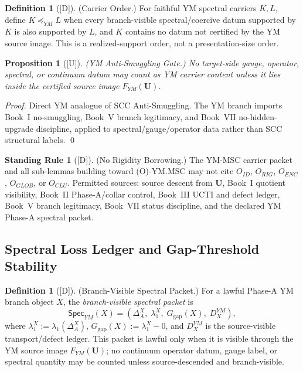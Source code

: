 \documentclass[12pt,oneside]{amsbook}
\theoremstyle{plain}
\newtheorem{proposition}[theorem]{Proposition}
\theoremstyle{definition}
\newtheorem{definition}[theorem]{Definition}
\newtheorem{standingrule}[theorem]{Standing Rule}
\theoremstyle{remark}
\newcommand{\status}[1]{\textup{[#1]}}
\begin{document}
\begin{definition}[\status{D}]\label{def:YM-carrier-order}
\textup{(Carrier Order.)}
For faithful YM spectral carriers $K, L$, define
$K \preceq_{YM} L$
when every branch-visible spectral/coercive datum supported by $K$
is also supported by $L$, and $K$ contains no datum not certified by
the YM source image.
This is a realized-support order, not a presentation-size order.
\end{definition}

\begin{proposition}[\status{U}]\label{prop:YM-anti-smuggling-gate}
\textup{(YM Anti-Smuggling Gate.)}
No target-side gauge, operator, spectral, or continuum datum may count
as YM carrier content unless it lies inside the certified source image
$F_{YM}(\mathbf{U})$.
\end{proposition}

\begin{proof}
Direct YM analogue of SCC Anti-Smuggling. The YM branch imports
Book~I no-smuggling, Book~V branch legitimacy, and Book~VII
no-hidden-upgrade discipline, applied to spectral/gauge/operator data
rather than SCC structural labels.
\qed
\end{proof}

\begin{standingrule}[\status{D}]\label{sr:YM-GTS-AC}
\textup{(No Rigidity Borrowing.)}
The YM-MSC carrier packet and all sub-lemmas building toward
(O)-YM.MSC may not cite $O_{ID}$, $O_{RIG}$, $O_{ENC}$, $O_{GLOB}$,
or $O_{CLU}$. Permitted sources: source descent from $\mathbf{U}$,
Book~I quotient visibility, Book~II Phase-A/collar control, Book~III
UCTI and defect ledger, Book~V branch legitimacy, Book~VII status
discipline, and the declared YM Phase-A spectral packet.
\end{standingrule}

\subsection{Spectral Loss Ledger and Gap-Threshold Stability}

\begin{definition}[\status{D}]\label{def:YM-branch-visible-spectral-packet}
\textup{(Branch-Visible Spectral Packet.)}
For a lawful Phase-A YM branch object $X$, the \emph{branch-visible
spectral packet} is
\[
 \mathsf{Spec}_{YM}(X)
 = (\Delta_A^X,\; \lambda_1^X,\; G_{\mathrm{gap}}(X),\; D_X^{YM}),
\]
where $\lambda_1^X := \lambda_1(\Delta_A^X)$,
$G_{\mathrm{gap}}(X) := \lambda_1^X - 0$,
and $D_X^{YM}$ is the source-visible transport/defect ledger.
This packet is lawful only when it is visible through the YM source
image $F_{YM}(\mathbf{U})$; no continuum operator datum, gauge label,
or spectral quantity may be counted unless source-descended and
branch-visible.
\end{definition}
\end{document}
